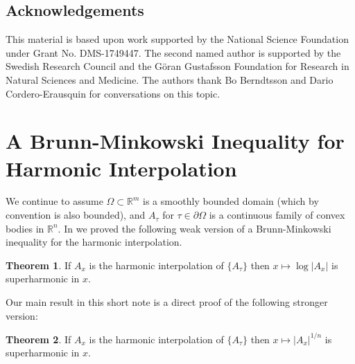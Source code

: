 \documentclass[reqno]{amsart}
\theoremstyle{definition}
\newtheorem{theorem}{Theorem}[section]
\theoremstyle{definition}
\theoremstyle{definition}
\begin{document}
\subsection*{Acknowledgements} This material is based upon work supported by the National Science Foundation under Grant No. DMS-1749447. The second named author is supported by the Swedish Research Council and the G\"oran Gustafsson Foundation for Research in Natural Sciences and Medicine. The authors thank Bo Berndtsson and Dario Cordero-Erausquin for conversations on this topic.

\section{A Brunn-Minkowski Inequality for Harmonic Interpolation}

We continue to assume $\Omega\subset \mathbb R^m$ is a smoothly bounded domain (which by convention is also bounded), and $A_{\tau}$ for $\tau\in \partial \Omega$ is a continuous family of convex bodies in $\mathbb R^n$.  In \cite{ross2022interpolation} we proved the following weak version of a Brunn-Minkowski inequality for the harmonic interpolation.

\begin{theorem}
If $A_x$ is the harmonic interpolation of $\{A_{\tau}\}$ then $x\mapsto \log|A_x|$ is superharmonic in $x$.
\end{theorem}

Our main result in this short note is a direct proof of the following stronger version:

\begin{theorem} \label{thm:main}
If $A_x$ is the harmonic interpolation of $\{A_{\tau}\}$ then $x\mapsto |A_x|^{1/n}$ is superharmonic in $x$.
\end{theorem}
\end{document}
